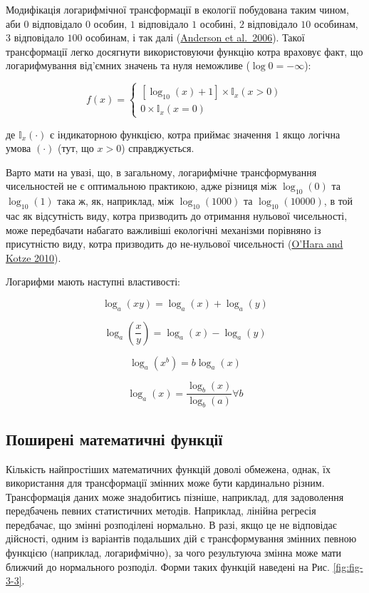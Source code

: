 \documentclass[
  11pt,
]{book}
\begin{document}
Модифікація логарифмічної трансформації в екології побудована таким чином, аби \(0\) відповідало \(0\) особин, \(1\) відповідало \(1\) особині, \(2\) відповідало \(10\) особинам, \(3\) відповідало \(100\) особинам, і так далі (\href{https://doi.org/10.1111/j.1461-0248.2006.00926.x}{Anderson et al.~2006}). Такої трансформації легко досягнути використовуючи функцію котра враховує факт, що логарифмування від'ємних значень та нуля неможливе (\(\log0 = -\infty\)):

\[f(x) = \begin{cases}
[\log_{10}(x)+1] \times \mathbb{I}_x(x > 0)\\
0 \times \mathbb{I}_x(x = 0)
\end{cases}\]

де \(\mathbb{I}_x(\cdot)\) є індикаторною функцією, котра приймає значення \(1\) якщо логічна умова \((\cdot)\) (тут, що \(x > 0\)) справджується.

Варто мати на увазі, що, в загальному, логарифмічне трансформування чисельностей не є оптимальною практикою, адже різниця між \(\log_{10}(0)\) та \(\log_{10}(1)\) така ж, як, наприклад, між \(\log_{10}(1000)\) та \(\log_{10}(10000)\), в той час як відсутність виду, котра призводить до отримання нульової чисельності, може передбачати набагато важливіші екологічні механізми порівняно із присутністю виду, котра призводить до не-нульової чисельності (\href{https://doi.org/10.1111/j.2041-210X.2010.00021.x}{O'Hara and Kotze 2010}).

Логарифми мають наступні властивості:

\[\log_a(xy) = \log_a(x) + \log_a(y)\]

\[\log_a(\frac{x}{y}) = \log_a(x) - \log_a(y)\]

\[\log_a(x^b) = b \log_a (x)\]

\[\log_a(x) = \frac{\log_b (x)}{\log_b (a)} \forall b\]

\subsection{Поширені математичні функції}\label{ux43fux43eux448ux438ux440ux435ux43dux456-ux43cux430ux442ux435ux43cux430ux442ux438ux447ux43dux456-ux444ux443ux43dux43aux446ux456ux457}

Кількість найпростіших математичних функцій доволі обмежена, однак, їх використання для трансформації змінних може бути кардинально різним. Трансформація даних може знадобитись пізніше, наприклад, для задоволення передбачень певних статистичних методів. Наприклад, лінійна регресія передбачає, що змінні розподілені нормально. В разі, якщо це не відповідає дійсності, одним із варіантів подальших дій є трансформування змінних певною функцією (наприклад, логарифмічно), за чого результуюча змінна може мати ближчий до нормального розподіл. Форми таких функцій наведені на Рис. \ref{fig:fig-3-3}.
\end{document}
